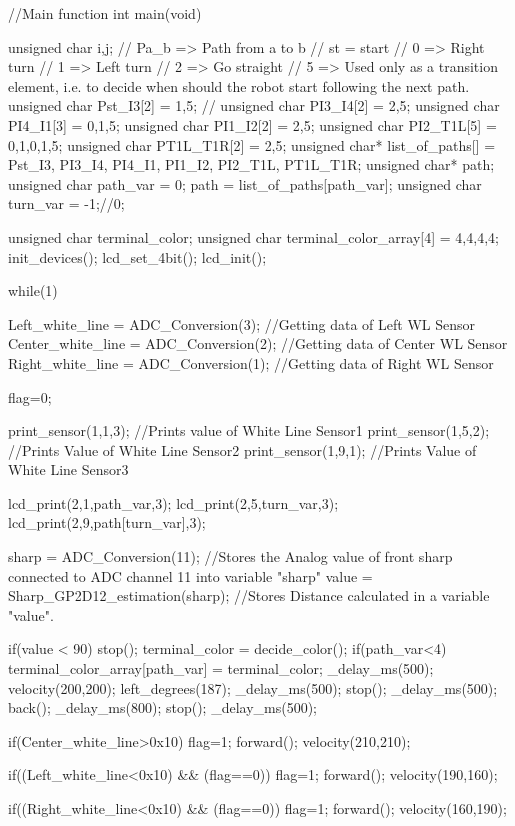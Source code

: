 //Main function
int main(void)
{
 unsigned char i,j;
 // Pa_b => Path from a to b
 // st = start
 // 0 => Right turn
 // 1 => Left turn
 // 2 => Go straight
 // 5 => Used only as a transition element, i.e. to decide when should the robot start following the next path.
 unsigned char Pst_I3[2] = {1,5}; // 
 unsigned char PI3_I4[2] = {2,5};
 unsigned char PI4_I1[3] = {0,1,5};
 unsigned char PI1_I2[2] = {2,5};
 unsigned char PI2_T1L[5] = {0,1,0,1,5};
 unsigned char PT1L_T1R[2] = {2,5};
 unsigned char* list_of_paths[] = {Pst_I3, PI3_I4, PI4_I1, PI1_I2, PI2_T1L, PT1L_T1R};
 unsigned char* path;
 unsigned char path_var = 0;
 path = list_of_paths[path_var];
 unsigned char turn_var = -1;//0;
 
 unsigned char terminal_color;
 unsigned char terminal_color_array[4] = {4,4,4,4};
 init_devices();
 lcd_set_4bit();
 lcd_init();
 
 while(1)
 {

	 Left_white_line = ADC_Conversion(3);	//Getting data of Left WL Sensor
	 Center_white_line = ADC_Conversion(2);	//Getting data of Center WL Sensor
	 Right_white_line = ADC_Conversion(1);	//Getting data of Right WL Sensor

	 flag=0;

	 print_sensor(1,1,3);	//Prints value of White Line Sensor1
	 print_sensor(1,5,2);	//Prints Value of White Line Sensor2
	 print_sensor(1,9,1);	//Prints Value of White Line Sensor3
	 
	 lcd_print(2,1,path_var,3);
	 lcd_print(2,5,turn_var,3);
	 lcd_print(2,9,path[turn_var],3);
	 
	 sharp = ADC_Conversion(11);						//Stores the Analog value of front sharp connected to ADC channel 11 into variable "sharp"
	 value = Sharp_GP2D12_estimation(sharp);            //Stores Distance calculated in a variable "value".
	 
	 if(value < 90)				
	 {
		 stop();
		 terminal_color = decide_color();
		 if(path_var<4)
		   {
		    terminal_color_array[path_var] = terminal_color;
		   }
		 _delay_ms(500);
		 velocity(200,200);
		 left_degrees(187);
		 _delay_ms(500);
		 stop();
		 _delay_ms(500);
		 back();
		 _delay_ms(800);
		 stop();
		 _delay_ms(500);
	 }
	 
	 if(Center_white_line>0x10)
	 {
		 flag=1;
		 forward();
		 velocity(210,210);
	 }

	 if((Left_white_line<0x10) && (flag==0))
	 {
		 flag=1;
		 forward();
		 velocity(190,160);
	 }

	 if((Right_white_line<0x10) && (flag==0))
	 {
		 flag=1;
		 forward();
		 velocity(160,190);
	 }

}}
